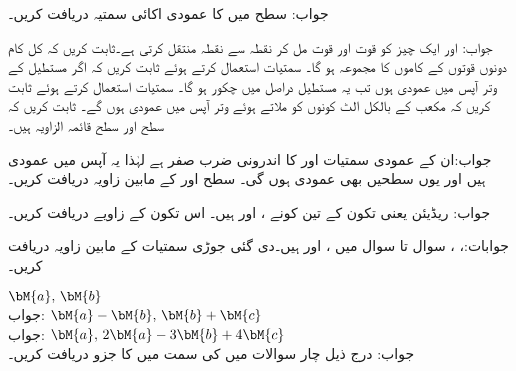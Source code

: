 جواب:
 سطح میں  کا عمودی اکائی سمتیہ دریافت کریں۔

جواب: اور 
ایک چیز کو قوت  اور قوت  مل کر نقطہ  سے نقطہ  منتقل کرتی ہے۔ثابت کریں کہ کل کام دونوں قوتوں کے کاموں کا مجموعہ ہو گا۔
سمتیات استعمال کرتے ہوئے ثابت کریں کہ اگر مستطیل کے وتر آپس میں عمودی ہوں تب یہ مستطیل دراصل میں چکور ہو گا۔
سمتیات استعمال کرتے ہوئے ثابت کریں کہ مکعب کے بالکل الٹ کونوں کو ملاتے ہوئے وتر آپس میں عمودی ہوں گے۔
ثابت کریں کہ سطح  اور سطح  قائمہ الزاویہ ہیں۔

جواب:ان کے عمودی سمتیات  اور  کا اندرونی ضرب صفر ہے لہٰذا یہ آپس میں عمودی ہیں اور یوں  سطحیں بھی عمودی ہوں گی۔
سطح  اور  کے مابین زاویہ دریافت کریں۔

جواب: ریڈیئن یعنی 
تکون کے تین کونے ،  اور  ہیں۔ اس تکون کے زاویے دریافت کریں۔

جوابات:، ، 
سوال  تا سوال  میں ،  اور  ہیں۔دی گئی جوڑی سمتیات کے مابین زاویہ دریافت کریں۔

\quad
$\bM{a}, \, \bM{b}$\\
جواب:
\quad
$\bM{a}-\bM{b}, \, \bM{b}+\bM{c}$\\
جواب:
\quad
$\bM{a}, \, 2\bM{a}-3\bM{b}+4\bM{c}$\\
جواب:
درج ذیل چار سوالات میں  کی سمت میں  کا جزو دریافت کریں۔

